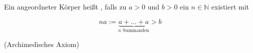 Ein angeordneter Körper heißt , falls zu $a > 0$ und $b > 0$ ein $n \in \mathbb{N}$ existiert mit

$$na := \underbrace{a+\dots+a}_{\text{$n$ Summanden}} > b$$

(Archimedisches Axiom)